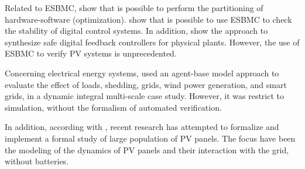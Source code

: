 \documentclass[journal]{IEEEtran}
\begin{document}
Related to ESBMC, \cite{Trindade} show that is possible to perform the partitioning of hardware-software (optimization). \cite{Bessa} show that is possible to use ESBMC to check the stability of digital control systems. In addition, \cite{Abateetal2017} show the approach to synthesize safe digital feedback controllers for physical plants. However, the use of ESBMC to verify PV systems is unprecedented. 

Concerning electrical energy systems, \cite{Kremers} used an agent-base model approach to evaluate the effect of loads, shedding, grids, wind power generation, and smart grids, in a dynamic integral multi-scale case study. However, it was restrict to simulation, without the formalism of automated verification.

In addition, according with \cite{Abate2017}, recent research has attempted to formalize and implement a formal study of large population of PV panels.%
 The focus have been the modeling of the dynamics of PV panels and their interaction with the grid, without batteries.
%
\end{document}
